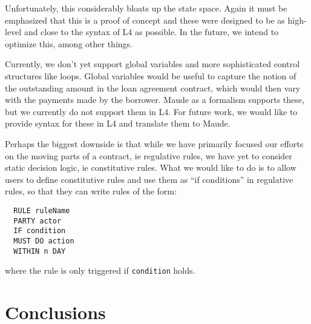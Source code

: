 \documentclass{article}
\begin{document}

Unfortunately, this considerably bloats up the state space.
Again it must be emphasized that this is a proof of concept and these were
designed to be as high-level and close to the syntax of L4 as possible.
In the future, we intend to optimize this, among other things.


Currently, we don't yet support global variables and more sophisticated control
structures like loops.
Global variables would be useful to capture the notion of the outstanding amount
in the loan agreement contract, which would then vary with the payments made by
the borrower.
Maude as a formalism supports these, but we currently do not support them in L4.
For future work, we would like to provide syntax for these in L4 and translate
them to Maude.

Perhaps the biggest downside is that while we have primarily focused our efforts
on the moving parts of a contract, ie regulative rules, we have yet to consider
static decision logic, ie constitutive rules.
What we would like to do is to allow users to define constitutive rules
and use them as ``if conditions'' in regulative rules, so that they can
write rules of the form:

\begin{lstlisting}
  RULE ruleName
  PARTY actor
  IF condition
  MUST DO action
  WITHIN n DAY
\end{lstlisting}

where the rule is only triggered if \texttt{condition} holds.

\section{Conclusions}

\newpage



\end{document}

